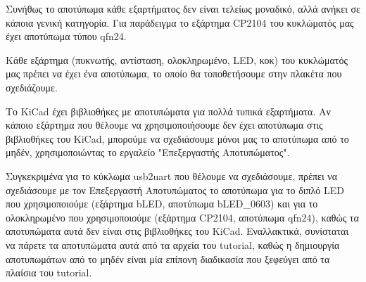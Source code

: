 \documentclass[a4paper]{article}
\begin{document}
Συνήθως το αποτύπωμα κάθε εξαρτήματος δεν είναι τελείως μοναδικό, αλλά ανήκει σε κάποια γενική κατηγορία. Για παράδειγμα το εξάρτημα \textenglish{CP2104} του κυκλώματός μας έχει αποτύπωμα τύπου qfn24.

Κάθε εξάρτημα (πυκνωτής, αντίσταση, ολοκληρωμένο, \textenglish{LED}, κοκ) του κυκλώματός μας πρέπει να έχει ένα αποτύπωμα, το οποίο θα τοποθετήσουμε στην πλακέτα που σχεδιάζουμε.

\begin{figure}
  \begin{center}
    \label{fig:kicad-main}
  \end{center}
\end{figure}

Το \textenglish{KiCad} έχει βιβλιοθήκες με αποτυπώματα για πολλά τυπικά εξαρτήματα. Αν κάποιο εξάρτημα που θέλουμε να χρησιμοποιήσουμε δεν έχει αποτύπωμα στις βιβλιοθήκες του \textenglish{KiCad}, μπορούμε να σχεδιάσουμε μόνοι μας το αποτύπωμα από το μηδέν, χρησιμοποιώντας το εργαλείο "Επεξεργαστής Αποτυπώματος".

Συγκεκριμένα για το κύκλωμα usb2uart που θέλουμε να σχεδιάσουμε, πρέπει να σχεδιάσουμε με τον Επεξεργαστή Αποτυπώματος το αποτύπωμα για το διπλό \textenglish{LED} που χρησιμοποιούμε (εξάρτημα b\textenglish{LED}, αποτύπωμα b\textenglish{LED}\_0603) και για το ολοκληρωμένο που χρησιμοποιούμε (εξάρτημα \textenglish{CP2104}, αποτύπωμα qfn24), καθώς τα αποτυπώματα αυτά δεν είναι στις βιβλιοθήκες του \textenglish{KiCad}. Εναλλακτικά, συνίσταται να πάρετε τα αποτυπώματα αυτά από τα αρχεία του tutorial, καθώς η δημιουργία αποτυπωμάτων από το μηδέν είναι μία επίπονη διαδικασία που ξεφεύγει από τα πλαίσια του tutorial.

\end{document}
